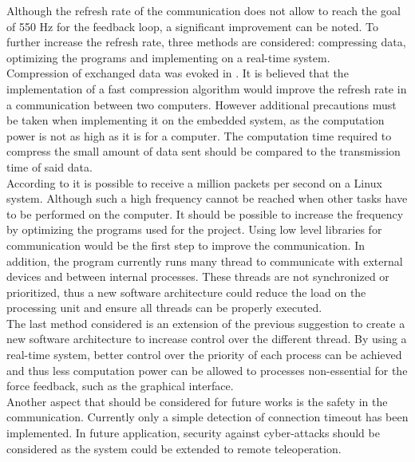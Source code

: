 Although the refresh rate of the communication does not allow to reach the goal of 550 Hz for the feedback loop, a significant improvement can be noted.  To further increase the refresh rate, three methods are considered: compressing data, optimizing the programs and implementing on a real-time system.\\
Compression of exchanged data was evoked in . It is believed that the implementation of a fast compression algorithm would improve the refresh rate in a communication between two computers. However additional precautions must be taken when implementing it on the embedded system, as the computation power is not as high as it is for a computer. The computation time required to compress the small amount of data sent should be compared to the transmission time of said data.\\
According to \cite{million_packets} it is possible to receive a million packets per second on a Linux system. Although such a high frequency cannot be reached when other tasks have to be performed on the computer. It should be possible to increase the frequency by optimizing the programs used for the project. Using low level libraries for communication would be the first step to improve the communication. In addition, the program currently runs many thread to communicate with external devices and between internal processes. These threads are not synchronized or prioritized, thus a new software architecture could reduce the load on the processing unit and ensure all threads can be properly executed.\\
The last method considered is an extension of the previous suggestion to create a new software architecture to increase control over the different thread. By using a real-time system, better control over the priority of each process can be achieved and thus less computation power can be allowed to processes non-essential for the force feedback, such as the graphical interface.\\
Another aspect that should be considered for future works is the safety in the communication. Currently only a simple detection of connection timeout has been implemented. In future application, security against cyber-attacks should be considered as the system could be extended to remote teleoperation.
